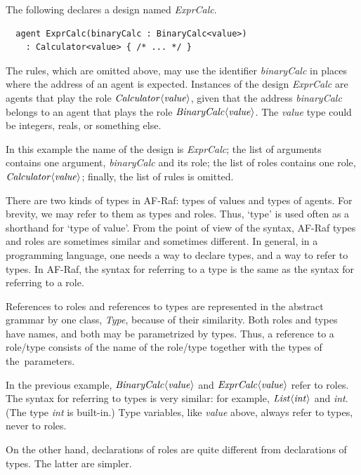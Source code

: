 \documentclass[a4paper,12pt,oneside,fleqn]{book} %
\begin{document}
\begin{example}
The following declares a design named {\it ExprCalc}.
\begin{verbatim}
  agent ExprCalc(binaryCalc : BinaryCalc<value>)
    : Calculator<value> { /* ... */ }
\end{verbatim}
The rules, which are omitted above, may use the identifier {\it
binaryCalc\/} in places where the address of an agent is expected.
Instances of the design {\it ExprCalc\/} are agents that play the role $\it
Calculator\langle value\rangle$, given that the address {\it binaryCalc\/}
belongs to an agent that plays the role $\it BinaryCalc\langle
value\rangle$. The {\it value\/} type could be integers, reals, or
something else.

In this example the name of the design is {\it ExprCalc\/}; the list of
arguments contains one argument, {\it binaryCalc\/} and its role; the list
of roles contains one role, $\it Calculator\langle value\rangle$; finally,
the list of rules is omitted.
\end{example}

There are two kinds of types in AF-Raf: types of values and types of
agents.  For brevity, we may refer to them as types and roles. Thus, `type'
is used often as a shorthand for `type of value'. From the point of view of
the syntax, AF-Raf types and roles are sometimes similar and sometimes
different. In general, in a programming language, one needs a way to
declare types, and a way to refer to types. In AF-Raf, the syntax for
referring to a type is the same as the syntax for referring to a role.

References to roles and references to types are represented in the abstract
grammar by one class, {\it Type}, because of their similarity. Both roles
and types have names, and both may be parametrized by types. Thus, a
reference to a role/type consists of the name of the role/type together
with the types of the~parameters.

\begin{example}
In the previous example, $\it BinaryCalc\langle value\rangle$ and $\it
ExprCalc\langle value\rangle$ refer to roles.  The syntax for referring to
types is very similar: for example, $\it List\langle int\rangle$ and {\it
int}. (The type {\it int\/} is built-in.) Type variables, like {\it value}
above, always refer to types, never to roles.
\end{example}

On the other hand, declarations of roles are quite different from
declarations of types. The latter are simpler.
\end{document}
